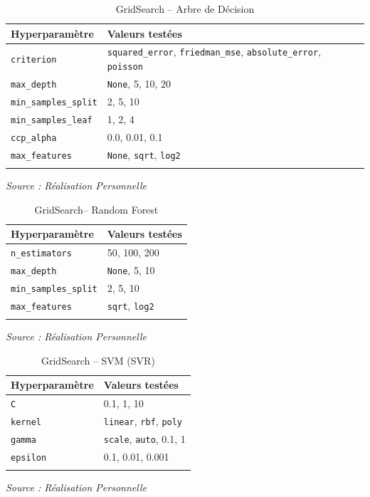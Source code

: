 \documentclass[a4paper,12pt, oneside]{article}
\begin{document}
\begin{longtable}{|p{5cm}|p{12cm}|}

\hline
\textbf{Hyperparamètre} & \textbf{Valeurs testées} \\
\hline
\texttt{criterion} & \texttt{squared\_error}, \texttt{friedman\_mse}, \texttt{absolute\_error}, \texttt{poisson} \\
\hline
\texttt{max\_depth} & \texttt{None}, 5, 10, 20 \\
\hline
\texttt{min\_samples\_split} & 2, 5, 10 \\
\hline
\texttt{min\_samples\_leaf} & 1, 2, 4 \\
\hline
\texttt{ccp\_alpha} & 0.0, 0.01, 0.1 \\
\hline
\texttt{max\_features} & \texttt{None}, \texttt{sqrt}, \texttt{log2} \\
\hline
\caption{GridSearch -- Arbre de Décision} \\
\end{longtable}
\begin{center}
\vspace{-0.85cm}
\textit{Source : Réalisation Personnelle}
\end{center}

\begin{longtable}{|p{5cm}|p{12cm}|}
\hline
\textbf{Hyperparamètre} & \textbf{Valeurs testées} \\
\hline
\texttt{n\_estimators} & 50, 100, 200 \\
\hline
\texttt{max\_depth} & \texttt{None}, 5, 10 \\
\hline
\texttt{min\_samples\_split} & 2, 5, 10 \\
\hline
\texttt{max\_features} & \texttt{sqrt}, \texttt{log2} \\
\hline
\caption{GridSearch-- Random Forest} \\
\end{longtable}
\begin{center}
\vspace{-0.85cm}
\textit{Source : Réalisation Personnelle}
\end{center}

\begin{longtable}{|p{5cm}|p{12cm}|}
\hline
\textbf{Hyperparamètre} & \textbf{Valeurs testées} \\
\hline
\texttt{C} & 0.1, 1, 10 \\
\hline
\texttt{kernel} & \texttt{linear}, \texttt{rbf}, \texttt{poly} \\
\hline
\texttt{gamma} & \texttt{scale}, \texttt{auto}, 0.1, 1 \\
\hline
\texttt{epsilon} & 0.1, 0.01, 0.001 \\
\hline
\caption{GridSearch -- SVM (SVR)} \\
\end{longtable}
\begin{center}
\vspace{-0.85cm}
\textit{Source : Réalisation Personnelle}
\end{center}
\end{document}
